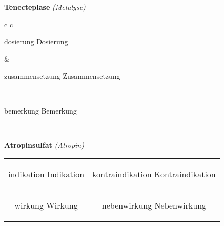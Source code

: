\documentclass[12pt]{beamer}
\begin{document}
\begin{frame}{
    \textbf{Tenecteplase}
    \textit{(Metalyse)}
}
    \begin{tabular}{c c}
        \begin{beamercolorbox}[wd=\boxwidth\textwidth,ht=\boxheight\textheight,sep=1em]{dosierung}
        Dosierung
        \end{beamercolorbox} & 
        \begin{beamercolorbox}[wd=\boxwidth\textwidth,ht=\boxheight\textheight,sep=1em]{zusammensetzung}
        Zusammensetzung
        \end{beamercolorbox} \\
        \begin{beamercolorbox}[wd=\textwidth,ht=\boxheight\textheight,sep=1em]{bemerkung}
        Bemerkung
        \end{beamercolorbox} \\
    \end{tabular}
\end{frame}

\begin{frame}{
    \textbf{Atropinsulfat}
    \textit{(Atropin)}
}
    \begin{tabular}{c c}
        \begin{beamercolorbox}[wd=\boxwidth\textwidth,ht=\boxheight\textheight,sep=1em]{indikation}
        Indikation
        \end{beamercolorbox} & 
        \begin{beamercolorbox}[wd=\boxwidth\textwidth,ht=\boxheight\textheight,sep=1em]{kontraindikation}
        Kontraindikation 
        \end{beamercolorbox} \\
        \begin{beamercolorbox}[wd=\boxwidth\textwidth,ht=\boxheight\textheight,sep=1em]{wirkung}
        Wirkung
        \end{beamercolorbox} & 
        \begin{beamercolorbox}[wd=\boxwidth\textwidth,ht=\boxheight\textheight,sep=1em]{nebenwirkung}
        Nebenwirkung
        \end{beamercolorbox} \\
    \end{tabular}
\end{frame}
\end{document}
